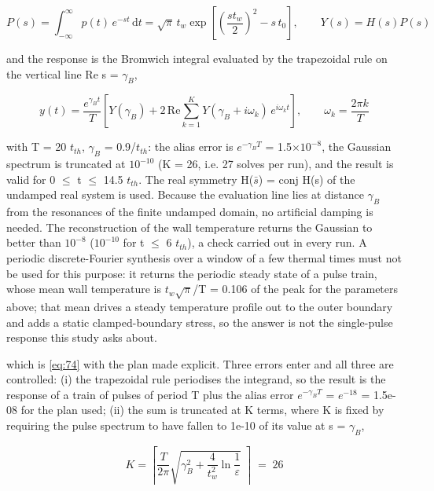\documentclass[preprint,12pt]{elsarticle}
\begin{document}
\begin{equation}
P(s)=\int_{-\infty}^{\infty}p(t)\,e^{-st}\,\mathrm{d}t=\sqrt{\pi}\,t_w\exp\left[\left(\frac{st_w}{2}\right)^2-s\,t_0\right],\qquad Y(s)=H(s)P(s) 
\label{eq:73}
\end{equation}

and the response is the Bromwich integral evaluated by the trapezoidal rule on the vertical line Re s = $\gamma_{B}$,

\begin{equation}
y(t)=\frac{e^{\gamma_B t}}{T}\left[Y(\gamma_B)+2\,\mathrm{Re}\sum_{k=1}^{K}Y(\gamma_B+i\omega_k)\,e^{i\omega_k t}\right],\qquad \omega_k=\frac{2\pi k}{T} 
\label{eq:74}
\end{equation}

with T = 20 $t_{th}$, $\gamma_{B}$ = 0.9/$t_{th}$: the alias error is $e^{-\gamma_{B}T}$ = 1.5$\times 10^{-8}$, the Gaussian spectrum is truncated at $10^{-10}$ (K = 26, i.e. 27 solves per run), and the result is valid for 0 $\leq$ t $\leq$ 14.5 $t_{th}$. The real symmetry H($\bar{s}$) = conj H(s) of the undamped real system is used. Because the evaluation line lies at distance $\gamma_{B}$ from the resonances of the finite undamped domain, no artificial damping is needed. The reconstruction of the wall temperature returns the Gaussian to better than $10^{-8}$ ($10^{-10}$ for t $\leq$ 6 $t_{th}$), a check carried out in every run. A periodic discrete-Fourier synthesis over a window of a few thermal times must not be used for this purpose: it returns the periodic steady state of a pulse train, whose mean wall temperature is $t_{w}\sqrt \pi$/T = 0.106 of the peak for the parameters above; that mean drives a steady temperature profile out to the outer boundary and adds a static clamped-boundary stress, so the answer is not the single-pulse response this study asks about.

which is \eqref{eq:74} with the plan made explicit. Three errors enter and all three are controlled: (i) the trapezoidal rule periodises the integrand, so the result is the response of a train of pulses of period T plus the alias error $e^{-\gamma_{B}T}$ = $e^{-18}$ = 1.5e-08 for the plan used; (ii) the sum is truncated at K terms, where K is fixed by requiring the pulse spectrum to have fallen to 1e-10 of its value at s = $\gamma_{B}$,

\begin{equation}
K=\left\lceil\frac{T}{2\pi}\sqrt{\gamma_B^2+\frac{4}{t_w^2}\ln\frac{1}{\varepsilon}}\;\right\rceil\;=\;26 
\label{eq:75}
\end{equation}
\end{document}
